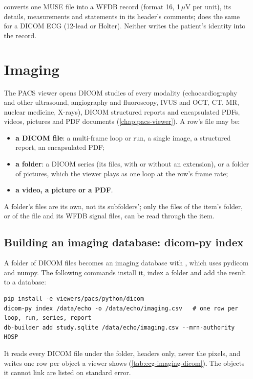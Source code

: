  converts one MUSE file into a WFDB record (format 16, 1\,$\mu$V
per unit), its details, measurements and statements in its header's comments;  does the same for a DICOM ECG (12-lead or Holter). Neither writes the patient's
identity into the record.

\section{Imaging}
\label{sec:ecg-imaging-imaging}


The PACS viewer opens DICOM studies of every modality (echocardiography and other ultrasound,
angiography and fluoroscopy, IVUS and OCT, CT, MR, nuclear medicine, X-rays), DICOM structured
reports and encapsulated PDFs, videos, pictures and PDF documents (\cref{chap:pacs-viewer}). A
row's file may be:
\begin{itemize}
\item \textbf{a DICOM file}: a multi-frame loop or run, a single image, a structured report, an
  encapsulated PDF;
\item \textbf{a folder}: a DICOM series (its files, with or without an extension), or a folder of
  pictures, which the viewer plays as one loop at the row's frame rate;
\item \textbf{a video, a picture or a PDF}.
\end{itemize}
A folder's files are its own, not its subfolders'; only the files of the item's folder, or of the
file and its WFDB signal files, can be read through the item.

\subsection{Building an imaging database: dicom-py index}
\label{sec:ecg-imaging-dicom}

A folder of DICOM files becomes an imaging database with , which uses pydicom
and numpy. The following commands install it, index a folder and add the result to a database:
\begin{lstlisting}[style=shell]
pip install -e viewers/pacs/python/dicom
dicom-py index /data/echo -o /data/echo/imaging.csv   # one row per loop, run, series, report
db-builder add study.sqlite /data/echo/imaging.csv --mrn-authority HOSP
\end{lstlisting}
It reads every DICOM file under the folder, headers only, never the pixels, and writes one row per
object a viewer shows (\cref{tab:ecg-imaging-dicom}). The objects it cannot link are listed on
standard error.

